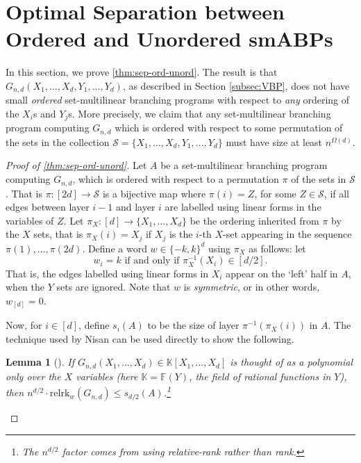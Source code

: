 \documentclass[10pt,a4paper]{article}
\newtheorem{lem}[theorem]{Lemma}
\theoremstyle{definition}%
\theoremstyle{plain}
\newcommand{\rk}{\mathrm{relrk}}
\newcommand{\F}{\mathbb F}
\newcommand{\calS}{\mathcal{S}}
\begin{document}
\section{Optimal Separation between Ordered and Unordered smABPs}\label{sec:opt-sep-sml-osml}
In this section, we prove \autoref{thm:sep-ord-unord}. The result is that $G_{n,d}(X_1,\ldots, X_d,Y_1,\ldots,Y_d)$, as described in Section \ref{subsec:VBP}, does not have small \emph{ordered} set-multilinear branching programs with respect to \emph{any} ordering of the $X_i$s and $Y_j$s. 
More precisely, we claim that any set-multilinear branching program computing $G_{n,d}$ which is ordered with respect to some permutation of the sets in the collection $\calS = \{X_1,\ldots, X_d,Y_1,\ldots,Y_d\}$ must have size at least $n^{\Omega(d)}$.

\begin{proof}[Proof of \autoref{thm:sep-ord-unord}]
    Let $A$ be a set-multilinear branching program computing $G_{n,d}$, which is ordered with respect to a permutation $\pi$ of the sets in $\calS$.
    That is $\pi: [2d]\rightarrow \calS$ is a bijective map where $\pi(i) = Z$, for some $Z\in \calS$, if all edges between layer $i-1$ and layer $i$ are labelled using linear forms in the variables of $Z$. 
    Let $\pi_X:[d]\rightarrow \{X_1,\ldots,X_d\}$ be the ordering inherited from $\pi$ by the $X$ sets, that is $\pi_X(i) = X_j$ if $X_j$ is the $i$-th $X$-set appearing in the sequence $\pi(1),\ldots,\pi(2d)$. 
    Define a word $w\in \{-k,k\}^d$ using $\pi_X$ as follows: let 
    \[
        w_i = k \text{ if and only if } \pi_X^{-1}(X_i)\in [d/2].
    \] 
    That is, the edges labelled using linear forms in $X_i$ appear on the `left' half in $A$, when the $Y$ sets are ignored. 
    Note that $w$ is \emph{symmetric}, or in other words, $w_{[d]} = 0$.

    Now, for $i\in[d]$, define $s_i(A)$ to be the size of layer $\pi^{-1}(\pi_X(i))$ in $A$.
    The technique used by Nisan \cite{Nisan91} can be used directly to show the following.

    \begin{lem}[\cite{Nisan91}]\label{lem:nisan-abpsize}
        If $G_{n,d}(X_1,\ldots,X_d)\in \mathbb{K}[X_1,\ldots,X_d]$ is thought of as a polynomial only over the $X$ variables (here $\mathbb{K} = \F(Y)$, the field of rational functions in $Y$), then $n^{d/2}\cdot \rk_w(G_{n,d})\leq s_{d/2}(A)$.\footnote{The $n^{d/2}$ factor comes from using relative-rank rather than rank.}
    \end{lem}


\end{proof}
\end{document}
